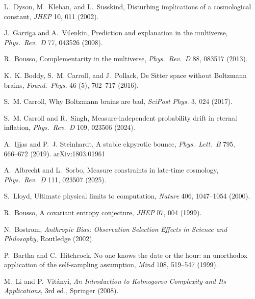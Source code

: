 \documentclass[12pt]{article}
\begin{document}

\begin{thebibliography}{99}
 L.~Dyson, M.~Kleban, and L.~Susskind, Disturbing implications of a cosmological constant, \emph{JHEP} 10, 011 (2002).

 J.~Garriga and A.~Vilenkin, Prediction and explanation in the multiverse, \emph{Phys.\ Rev.\ D} 77, 043526 (2008).

 R.~Bousso, Complementarity in the multiverse, \emph{Phys.\ Rev.\ D} 88, 083517 (2013).

 K.~K. Boddy, S.~M. Carroll, and J.~Pollack, De Sitter space without Boltzmann brains, \emph{Found.\ Phys.} 46 (5), 702–717 (2016).

 S.~M. Carroll, Why Boltzmann brains are bad, \emph{SciPost Phys.} 3, 024 (2017).

 S.~M. Carroll and R.~Singh, Measure-independent probability drift in eternal inflation, \emph{Phys.\ Rev.\ D} 109, 023506 (2024).

 A.~Ijjas and P.~J. Steinhardt, A stable ekpyrotic
bounce, \emph{Phys.\ Lett.\ B} 795, 666–672 (2019). arXiv:1803.01961

A.~Albrecht and L.~Sorbo,
Measure constraints in late-time cosmology,
\emph{Phys.\ Rev.\ D} 111, 023507 (2025).

 S.~Lloyd, Ultimate physical limits to computation,
\emph{Nature} 406, 1047–1054 (2000).

 R.~Bousso, A covariant entropy conjecture, \emph{JHEP} 07, 004 (1999).

 N.~Bostrom, \emph{Anthropic Bias: Observation Selection Effects in Science and Philosophy}, Routledge (2002).

 P.~Bartha and C.~Hitchcock, No one knows the date or the hour: an unorthodox application of the self-sampling assumption, \emph{Mind} 108, 519–547 (1999).

 M.~Li and P.~Vitányi, \emph{An Introduction to Kolmogorov Complexity and Its Applications}, 3rd ed., Springer (2008).
\end{thebibliography}
\end{document}
